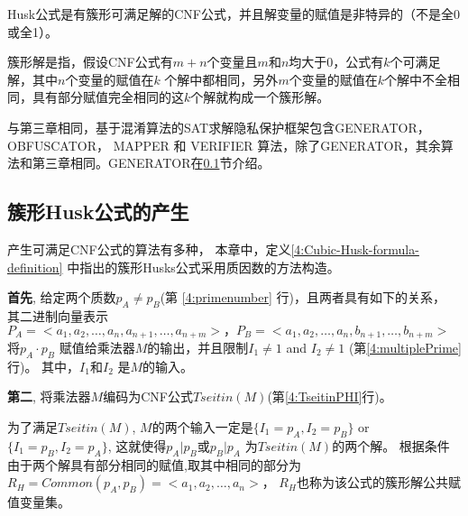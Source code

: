 \begin{definition}[簇形Husks 公式]\label{4:Cubic-Husk-formula-definition}
Husk公式是有簇形可满足解的CNF公式，并且解变量的赋值是非特异的（不是全0或全1）。
\end{definition}

\begin{definition}[簇形解]\label{4:Cubic-Husk-Solution-definition}
簇形解是指，假设CNF公式有$m+n$个变量且$m$和$n$均大于0，公式有$k$个可满足解，其中$n$个变量的赋值在$k$ 个解中都相同，另外$m$个变量的赋值在$k$个解中不全相同，具有部分赋值完全相同的这$k$个解就构成一个簇形解。
\end{definition}

与第三章相同，基于混淆算法的SAT求解隐私保护框架包含GENERATOR， OBFUSCATOR， MAPPER 和 VERIFIER 算法，除了GENERATOR，其余算法和第三章相同。GENERATOR在\ref{4:genhusk}节介绍。

\subsection{簇形Husk公式的产生}\label{4:genhusk}
产生可满足CNF公式的算法有多种，
本章中，定义\ref{4:Cubic-Husk-formula-definition} 中指出的簇形Husks公式采用质因数的方法构造。

%
\textbf{首先},
给定两个质数$p_A \neq p_B$(第 \ref{4:primenumber} 行)，且两者具有如下的关系，
其二进制向量表示$P_A=<a_1,a_2,\dots,a_n,a_{n+1},\dots,a_{n+m}>，
P_B=<a_1,a_2,…,a_n,b_{n+1},…,b_{n+m}>$
将$p_A \cdot p_B$ 赋值给乘法器$M$的输出，并且限制$I_1\ne 1$ and  $I_2\ne 1$ (第\ref{4:multiplePrime}行)。
其中，$I_1$和$I_2$ 是$M$的输入。

\textbf{第二},
将乘法器$M$编码为CNF公式$Tseitin(M)$(第\ref{4:TseitinPHI}行)。

为了满足$Tseitin(M)$, $M$的两个输入一定是$\{I_1=p_A,I_2=p_B\}$ or $\{I_1=p_B,I_2=p_A\}$,
这就使得$p_A|p_B$或$p_B|p_A$ 为$Tseitin(M)$的两个解。
根据条件由于两个解具有部分相同的赋值,取其中相同的部分为$R_H=Common(p_A,p_B)=<a_1,a_2,\dots,a_n>$，
$R_H$也称为该公式的簇形解公共赋值变量集。

